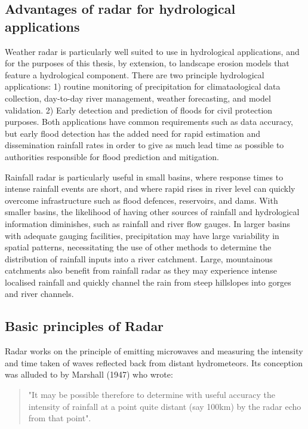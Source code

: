 \subsection{Advantages of radar for hydrological applications}
Weather radar is particularly well suited to use in hydrological applications, and for the purposes of this thesis, by extension, to landscape erosion models that feature a hydrological component. There are two principle hydrological applications: 1) routine monitoring of precipitation for climataological data collection, day-to-day river management, weather forecasting, and model validation. 2) Early detection and prediction of floods for civil protection purposes. Both applications have common requirements such as data accuracy, but early flood detection has the added need for rapid estimation and dissemination rainfall rates in order to give as much lead time as possible to authorities responsible for flood prediction and mitigation. 

Rainfall radar is particularly useful in small basins, where response times to intense rainfall events are short, and where rapid rises in river level can quickly overcome infrastructure such as flood defences, reservoirs, and dams. With smaller basins, the likelihood of having other sources of rainfall and hydrological information diminishes, such as rainfall and river flow gauges. In larger basins with adequate gauging facilities, precipitation may have large variability in spatial patterns, necessitating the use of other methods to determine the distribution of rainfall inputs into a river catchment. Large, mountainous catchments also benefit from rainfall radar as they may experience intense localised rainfall and quickly channel the rain from steep hillslopes into gorges and river channels.



\subsection{Basic principles of Radar}

Radar works on the principle of emitting microwaves and measuring the intensity and time taken of waves reflected back from distant hydrometeors. Its conception was alluded to by Marshall (1947) who wrote: 

\begin{quotation}
"It may be possible therefore to determine with useful accuracy the intensity of rainfall at a point quite distant (say 100km) by the radar echo from that point".
\end{quotation}

